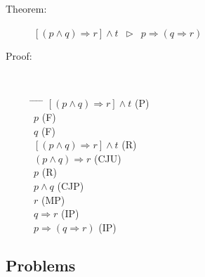 \documentclass{article}
\newcommand{\0}{\mathbf 0}
\newcommand{\1}{\mathbf 1}
\newcommand{\der}{\vartriangleright}
\begin{document}
\begin{description}
  \item[Theorem:] $[(p \land q) \Rightarrow r] \land t \enspace \der \enspace p \Rightarrow (q \Rightarrow r)$

  \item[Proof:] $\ $

    \begin{tabbing}
    \hspace{1cm} \= \hspace{1cm} \= \hspace{1cm} \= \hspace{4cm} \= \kill
    \> $[(p \land q) \Rightarrow r] \land t$ \>     \>                                       \> (P)   \\
    \>                                       \> $p$ \>                                       \> (F)   \\
    \>                                       \>     \> $q$                                   \> (F)   \\
    \>                                       \>     \> $[(p \land q) \Rightarrow r] \land t$ \> (R)   \\
    \>                                       \>     \> $(p \land q) \Rightarrow r$           \> (CJU) \\
    \>                                       \>     \> $p$                                   \> (R)   \\
    \>                                       \>     \> $p\land q$                            \> (CJP) \\
    \>                                       \>     \> $r$                                   \> (MP)  \\
    \>                                       \> $q \Rightarrow r$ \>                         \> (IP)  \\
    \> $p \Rightarrow (q \Rightarrow r)$     \>     \>                                       \> (IP)
    \end{tabbing}
\end{description}


\subsection*{Problems}
\end{document}
